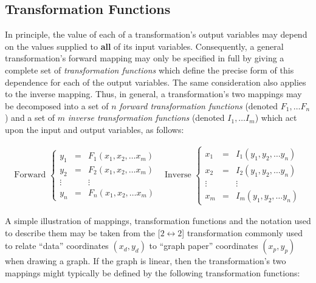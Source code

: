 \subsection{Transformation Functions}

In principle, the value of each of a transformation's output variables may
depend on the values supplied to {\bf all} of its input variables. 
Consequently, a general transformation's forward mapping may only be
specified in full by giving a complete set of {\em transformation functions}
which define the precise form of this dependence for each of the output 
variables.
The same consideration also applies to the inverse mapping. 
Thus, in general, a transformation's two mappings may be decomposed into a
set of $n$ {\em forward transformation functions} (denoted \mbox{$F_1,\ldots
F_n$}) and a set of $m$ {\em inverse transformation functions} (denoted
\mbox{$I_1,\ldots I_m$}) which act upon the input and output variables, as
follows: 

\begin{equation}
\begin{array}{cc}
\mbox{Forward }
\left\{
\begin{array}{ccc}
y_1 & = & F_1(x_1, x_2,\ldots x_m)\\
y_2 & = & F_2(x_1, x_2,\ldots x_m)\\
\vdots & & \vdots\\
y_n & = & F_n(x_1, x_2,\ldots x_m)
\end{array}
\right.
&
\mbox{Inverse }
\left\{
\begin{array}{ccc}
x_1 & = & I_1(y_1, y_2,\ldots y_n)\\
x_2 & = & I_2(y_1, y_2,\ldots y_n)\\
\vdots & & \vdots\\
x_m & = & I_m(y_1, y_2,\ldots y_n)
\end{array}
\right.
\end{array}
\label{equation:transformationfunctions}
\end{equation}

A simple illustration of mappings, transformation functions and the notation
used to describe them may be taken from the \mbox{[$2 \leftrightarrow 2$]}
transformation commonly used to relate ``data'' coordinates $(x_d,y_d)$ to
``graph paper'' coordinates $(x_p,y_p)$ when drawing a graph. 
If the graph is linear, then the transformation's two mappings might
typically be defined by the following transformation functions: 

